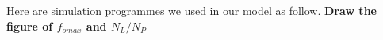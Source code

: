 \documentclass{mcmthesis}
\begin{document}
	\begin{appendices}
		
		Here are simulation programmes we used in our model as follow.
		\noindent \textbf{\textcolor[rgb]{0.98,0.00,0.00}{Draw the figure of $f_{omax}$ and $N_L/N_P$}}
		
%		
%		
%		
%		
%		
%		
%		
%		
%		
%		
	\end{appendices}
\end{document}
